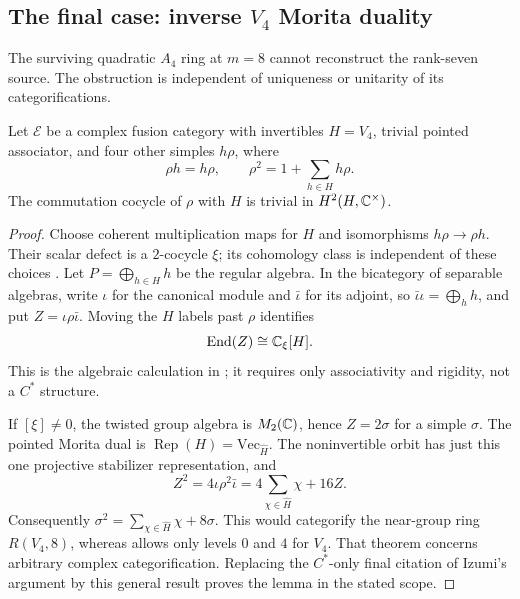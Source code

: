 \subsection{The final case: inverse \texorpdfstring{$V_4$}{V4} Morita duality}
\label{subsec:inverse-v4}
The surviving quadratic $A_4$ ring at $m=8$ cannot reconstruct the
rank-seven source. The obstruction is independent of uniqueness or
unitarity of its categorifications.

\begin{lemma}\label{lem:v4-commutation}
Let $\mathcal E$ be a complex fusion category with invertibles
$H=V_4$, trivial pointed associator, and four other simples $h\rho$,
where
\[
 \rho h=h\rho,\qquad \rho^2=1+\sum_{h\in H}h\rho.
\]
The commutation cocycle of $\rho$ with $H$ is trivial in
$H^2(H,\mathbb C^\times)$.
\end{lemma}
\begin{proof}
Choose coherent multiplication maps for $H$ and isomorphisms
$h\rho\to\rho h$. Their scalar defect is a $2$-cocycle $\xi$;
its cohomology class is independent of these choices
\cite[Section~2]{Izumi3n}. Let $P=\bigoplus_{h\in H}h$ be the
regular algebra. In the bicategory of separable algebras, write
$\iota$ for the canonical module and $\bar\iota$ for its adjoint,
so $\bar\iota\iota=\bigoplus_hh$, and put
$Z=\iota\rho\bar\iota$. Moving the $H$ labels past $\rho$
identifies
\[
              \operatorname{End}(Z)\cong\mathbb C_\xi[H].
\]
This is the algebraic calculation in
\cite[Proposition~9.6]{Izumi3n}; it requires only associativity and
rigidity, not a $C^*$ structure.

If $[\xi]\ne0$, the twisted group algebra is $M_2(\mathbb C)$, hence
$Z=2\sigma$ for a simple $\sigma$. The pointed Morita dual is
$\operatorname{Rep}(H)=\mathrm{Vec}_{\widehat H}$. The noninvertible
orbit has just this one projective stabilizer representation, and
\[
 Z^2=4\iota\rho^2\bar\iota
     =4\sum_{\chi\in\widehat H}\chi+16Z.
\]
Consequently
$\sigma^2=\sum_{\chi\in\widehat H}\chi+8\sigma$.
This would categorify the near-group ring $R(V_4,8)$, whereas
\cite[Theorem~1.1]{Schopieray} allows only levels $0$ and $4$
for $V_4$. That theorem concerns arbitrary complex categorification.
Replacing the $C^*$-only final citation of Izumi's argument by this
general result proves the lemma in the stated scope.
\end{proof}

